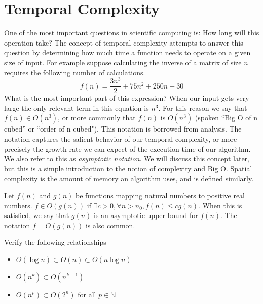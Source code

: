 

\section*{Temporal Complexity}
One of the most important questions in scientific computing is: 
How long will this operation take?  
The concept of temporal complexity attempts to answer this question by determining 
how much time a function needs to operate on a given size of input.  
For example suppose calculating the inverse of a matrix of size $n$ requires the following number of calculations.
\begin{equation*}
f(n) = \frac{3n^3}{2} + 75n^2 + 250n + 30
\end{equation*}
What is the most important part of this expression? 
When our input gets very large the only relevant term in this equation is $n^3$. 
For this reason we say that $f(n) \in O(n^3)$, or more commonly that $f(n)$ is $O(n^3)$ 
(spoken ``Big O of n cubed'' or ``order of n cubed"). 
This notation is borrowed from analysis. The notation captures the salient behavior of our temporal complexity, 
or more precisely the growth rate we can expect of the execution time of our algorithm. 
We also refer to this as \emph{asymptotic notation}. 
We will discuss this concept later, but this is a simple introduction to the notion of complexity and Big O.
Spatial complexity is the amount of memory an algorithm uses, and is defined similarly.  

\begin{definition}[Big O]
Let $f(n)$ and $g(n)$ be functions mapping natural numbers to positive real numbers. 
$f \in O(g(n))$ if $\exists c > 0, \forall n > n_0, f(n) \leq cg(n)$. 
When this is satisfied, we say that $g(n)$ is an asymptotic upper bound for $f(n)$. 
The notation $f = O(g(n))$ is also common.
\end{definition}

\begin{problem}
Verify the following relationships
\begin{itemize}
\item $O(\log{n}) \subset O(n) \subset O(n\log{n})$
\item $O(n^k) \subset O(n^{k+1})$
\item $O(n^p) \subset O(2^n)$ for all $p \in \mathbb{N}$
\end{itemize}
\end{problem}


